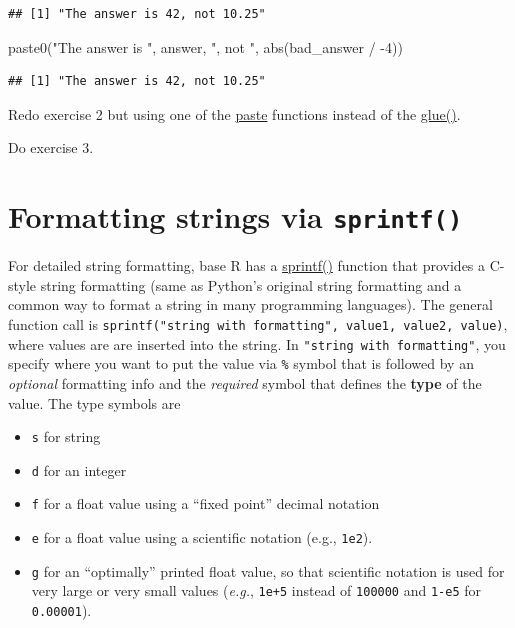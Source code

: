 \documentclass[
]{book}
\newenvironment{Shaded}{\begin{snugshade}}{\end{snugshade}}
\newcommand{\DecValTok}[1]{\textcolor[rgb]{0.00,0.00,0.81}{#1}}
\newcommand{\FunctionTok}[1]{\textcolor[rgb]{0.00,0.00,0.00}{#1}}
\newcommand{\NormalTok}[1]{#1}
\newcommand{\SpecialCharTok}[1]{\textcolor[rgb]{0.00,0.00,0.00}{#1}}
\newcommand{\StringTok}[1]{\textcolor[rgb]{0.31,0.60,0.02}{#1}}
\providecommand{\tightlist}{%
  \setlength{\itemsep}{0pt}\setlength{\parskip}{0pt}}
\begin{document}
\begin{verbatim}
## [1] "The answer is 42, not 10.25"
\end{verbatim}

\begin{Shaded}
\begin{Highlighting}[]
\FunctionTok{paste0}\NormalTok{(}\StringTok{"The answer is "}\NormalTok{, answer, }\StringTok{", not "}\NormalTok{, }\FunctionTok{abs}\NormalTok{(bad\_answer }\SpecialCharTok{/} \SpecialCharTok{{-}}\DecValTok{4}\NormalTok{))}
\end{Highlighting}
\end{Shaded}

\begin{verbatim}
## [1] "The answer is 42, not 10.25"
\end{verbatim}

Redo exercise 2 but using one of the \href{https://stat.ethz.ch/R-manual/R-devel/library/base/html/paste.html}{paste} functions instead of the \href{https://glue.tidyverse.org/reference/glue.html}{glue()}.

Do exercise 3.

\hypertarget{sprintf}{%
\section{\texorpdfstring{Formatting strings via \texttt{sprintf()}}{Formatting strings via sprintf()}}\label{sprintf}}

For detailed string formatting, base R has a \href{https://stat.ethz.ch/R-manual/R-patched/library/base/html/sprintf.html}{sprintf()} function that provides a C-style string formatting (same as Python's original string formatting and a common way to format a string in many programming languages). The general function call is \texttt{sprintf("string\ with\ formatting",\ value1,\ value2,\ value)}, where values are are inserted into the string. In \texttt{"string\ with\ formatting"}, you specify where you want to put the value via \texttt{\%} symbol that is followed by an \emph{optional} formatting info and the \emph{required} symbol that defines the \textbf{type} of the value. The type symbols are

\begin{itemize}
\tightlist
\item
  \texttt{s} for string
\item
  \texttt{d} for an integer
\item
  \texttt{f} for a float value using a ``fixed point'' decimal notation
\item
  \texttt{e} for a float value using a scientific notation (e.g., \texttt{1e2}).
\item
  \texttt{g} for an ``optimally'' printed float value, so that scientific notation is used for very large or very small values (\emph{e.g.}, \texttt{1e+5} instead of \texttt{100000} and \texttt{1-e5} for \texttt{0.00001}).
\end{itemize}
\end{document}
